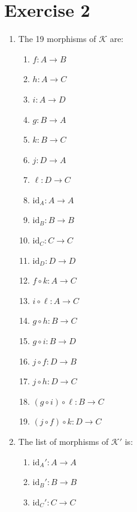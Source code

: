 \documentclass[11pt]{article}
\begin{document}
\section*{Exercise 2}

\begin{enumerate}[label=(\alph*)]
    \item The 19 morphisms of $\mathcal{K}$ are:
    \begin{multicols}{3}
        \begin{enumerate}[label=(\arabic*)]
            \item $f : A \to B$
            \item $h : A \to C$
            \item $i : A \to D$
            \item $g : B \to A$
            \item $k : B \to C$
            \item $j : D \to A$
            \item $\ell : D \to C$
            \item $\mathrm{id}_{A} : A \to A$
            \item $\mathrm{id}_{B} : B \to B$
            \item $\mathrm{id}_{C} : C \to C$
            \item $\mathrm{id}_{D} : D \to D$
            \item $f\circ  k : A \to C$
            \item $i\circ  \ell : A \to C$
            \item $g\circ  h : B \to C$
            \item $g\circ  i : B \to D$
            \item $j\circ  f : D \to B$
            \item $j\circ  h : D \to C$
            \item $(g \circ i) \circ \ell : B \to C$
            \item $(j \circ f) \circ k : D \to C$ 
        \end{enumerate}
    \end{multicols}
    \item The list of morphisms of $\mathcal{K}'$ is:
    \begin{multicols}{3}
        \begin{enumerate}[label=(\arabic*)]
            \item $\mathrm{id}_{A}' : A \to A$
            \item $\mathrm{id}_{B}' : B \to B$
            \item $\mathrm{id}_{C}' : C \to C$

\end{enumerate}
\end{multicols}
\end{enumerate}
\end{document}

